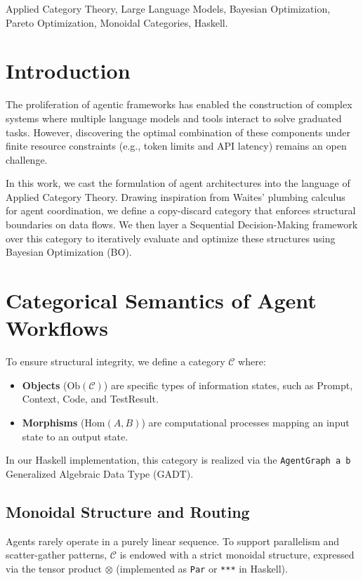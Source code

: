 \documentclass[journal]{IEEEtran}
\begin{document}
\begin{IEEEkeywords}
Applied Category Theory, Large Language Models, Bayesian Optimization, Pareto Optimization, Monoidal Categories, Haskell.
\end{IEEEkeywords}

\section{Introduction}
The proliferation of agentic frameworks has enabled the construction of complex systems where multiple language models and tools interact to solve graduated tasks. However, discovering the optimal combination of these components under finite resource constraints (e.g., token limits and API latency) remains an open challenge. 

In this work, we cast the formulation of agent architectures into the language of Applied Category Theory. Drawing inspiration from Waites' plumbing calculus for agent coordination, we define a copy-discard category that enforces structural boundaries on data flows. We then layer a Sequential Decision-Making framework over this category to iteratively evaluate and optimize these structures using Bayesian Optimization (BO).

\section{Categorical Semantics of Agent Workflows}

To ensure structural integrity, we define a category \(\mathcal{C}\) where:
\begin{itemize}
    \item \textbf{Objects} (\(\text{Ob}(\mathcal{C})\)) are specific types of information states, such as \textsf{Prompt}, \textsf{Context}, \textsf{Code}, and \textsf{TestResult}.
    \item \textbf{Morphisms} (\(\text{Hom}(A, B)\)) are computational processes mapping an input state to an output state.
\end{itemize}

In our Haskell implementation, this category is realized via the \texttt{AgentGraph a b} Generalized Algebraic Data Type (GADT).

\subsection{Monoidal Structure and Routing}
Agents rarely operate in a purely linear sequence. To support parallelism and scatter-gather patterns, \(\mathcal{C}\) is endowed with a strict monoidal structure, expressed via the tensor product \(\otimes\) (implemented as \texttt{Par} or \texttt{***} in Haskell).
\end{document}
